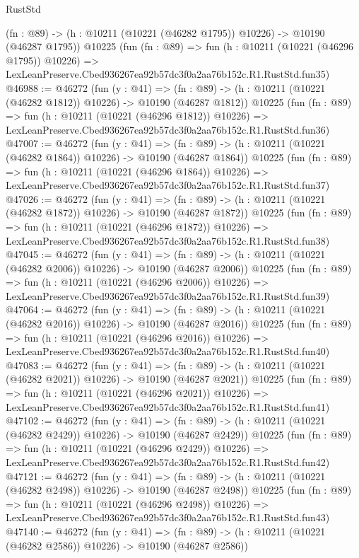 \begin{lexlean}{RustStd}
\begin{coremodule}
    (fn : @89) -> (h : @10211 (@10221 (@46282 @1795)) @10226) -> @10190 (@46287 @1795))
    @10225
    (fun (fn : @89) =>
    fun (h : @10211 (@10221 (@46296 @1795)) @10226) =>
    LexLeanPreserve.Cbed936267ea92b57dc3f0a2aa76b152c.R1.RustStd.fun35)
@46988 := @46272
    (fun (y : @41) =>
    (fn : @89) -> (h : @10211 (@10221 (@46282 @1812)) @10226) -> @10190 (@46287 @1812))
    @10225
    (fun (fn : @89) =>
    fun (h : @10211 (@10221 (@46296 @1812)) @10226) =>
    LexLeanPreserve.Cbed936267ea92b57dc3f0a2aa76b152c.R1.RustStd.fun36)
@47007 := @46272
    (fun (y : @41) =>
    (fn : @89) -> (h : @10211 (@10221 (@46282 @1864)) @10226) -> @10190 (@46287 @1864))
    @10225
    (fun (fn : @89) =>
    fun (h : @10211 (@10221 (@46296 @1864)) @10226) =>
    LexLeanPreserve.Cbed936267ea92b57dc3f0a2aa76b152c.R1.RustStd.fun37)
@47026 := @46272
    (fun (y : @41) =>
    (fn : @89) -> (h : @10211 (@10221 (@46282 @1872)) @10226) -> @10190 (@46287 @1872))
    @10225
    (fun (fn : @89) =>
    fun (h : @10211 (@10221 (@46296 @1872)) @10226) =>
    LexLeanPreserve.Cbed936267ea92b57dc3f0a2aa76b152c.R1.RustStd.fun38)
@47045 := @46272
    (fun (y : @41) =>
    (fn : @89) -> (h : @10211 (@10221 (@46282 @2006)) @10226) -> @10190 (@46287 @2006))
    @10225
    (fun (fn : @89) =>
    fun (h : @10211 (@10221 (@46296 @2006)) @10226) =>
    LexLeanPreserve.Cbed936267ea92b57dc3f0a2aa76b152c.R1.RustStd.fun39)
@47064 := @46272
    (fun (y : @41) =>
    (fn : @89) -> (h : @10211 (@10221 (@46282 @2016)) @10226) -> @10190 (@46287 @2016))
    @10225
    (fun (fn : @89) =>
    fun (h : @10211 (@10221 (@46296 @2016)) @10226) =>
    LexLeanPreserve.Cbed936267ea92b57dc3f0a2aa76b152c.R1.RustStd.fun40)
@47083 := @46272
    (fun (y : @41) =>
    (fn : @89) -> (h : @10211 (@10221 (@46282 @2021)) @10226) -> @10190 (@46287 @2021))
    @10225
    (fun (fn : @89) =>
    fun (h : @10211 (@10221 (@46296 @2021)) @10226) =>
    LexLeanPreserve.Cbed936267ea92b57dc3f0a2aa76b152c.R1.RustStd.fun41)
@47102 := @46272
    (fun (y : @41) =>
    (fn : @89) -> (h : @10211 (@10221 (@46282 @2429)) @10226) -> @10190 (@46287 @2429))
    @10225
    (fun (fn : @89) =>
    fun (h : @10211 (@10221 (@46296 @2429)) @10226) =>
    LexLeanPreserve.Cbed936267ea92b57dc3f0a2aa76b152c.R1.RustStd.fun42)
@47121 := @46272
    (fun (y : @41) =>
    (fn : @89) -> (h : @10211 (@10221 (@46282 @2498)) @10226) -> @10190 (@46287 @2498))
    @10225
    (fun (fn : @89) =>
    fun (h : @10211 (@10221 (@46296 @2498)) @10226) =>
    LexLeanPreserve.Cbed936267ea92b57dc3f0a2aa76b152c.R1.RustStd.fun43)
@47140 := @46272
    (fun (y : @41) =>
    (fn : @89) -> (h : @10211 (@10221 (@46282 @2586)) @10226) -> @10190 (@46287 @2586))

\end{coremodule}
\end{lexlean}
